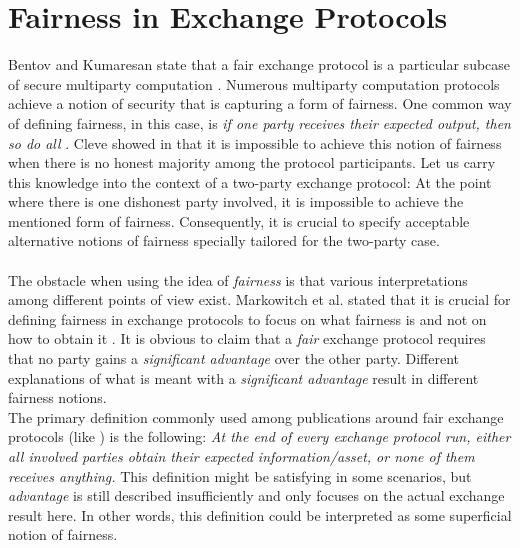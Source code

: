 \documentclass{cacthesis}
\newcounter{protocol}
\begin{document}
        

    \chapter{Fairness in Exchange Protocols}
    \label{sec:Fairness}
        Bentov and Kumaresan state that a fair exchange protocol is a particular subcase of secure multiparty computation \cite{10.1007/978-3-662-44381-1_24}. Numerous multiparty computation protocols achieve a notion of security that is capturing a form of fairness. One common way of defining fairness, in this case, is \textit{if one party receives their expected output, then so do all} \cite{10.1007/978-3-540-79263-5_8}. Cleve showed in \cite{10.1145/12130.12168} that it is impossible to achieve this notion of fairness when there is no honest majority among the protocol participants. Let us carry this knowledge into the context of a two-party exchange protocol: At the point where there is one dishonest party involved, it is impossible to achieve the mentioned form of fairness. Consequently, it is crucial to specify acceptable alternative notions of fairness specially tailored for the two-party case.   \\\\
        The obstacle when using the idea of \textit{fairness} is that various interpretations among different points of view exist. Markowitch et al. stated that it is crucial for defining fairness in exchange protocols to focus on what fairness is and not on how to obtain it \cite{10.1007/3-540-36552-4_31}. It is obvious to claim that a \textit{fair} exchange protocol requires that no party gains a \textit{significant advantage} over the other party. Different explanations of what is meant with a \textit{significant advantage} result in different fairness notions. \\
        The primary definition commonly used among publications around fair exchange protocols (like \cite{10.1145/266420.266426} \cite{asyncOptiFairEx1998} \cite{remarksOnFairEx2000})  is the following: \textit{At the end of every exchange protocol run, either all involved parties obtain their expected information/asset, or none of them receives anything.} This definition might be satisfying in some scenarios, but \textit{advantage} is still described insufficiently and only focuses on the actual exchange result here. In other words, this definition could be interpreted as some superficial notion of fairness. \\\\
\end{document}
